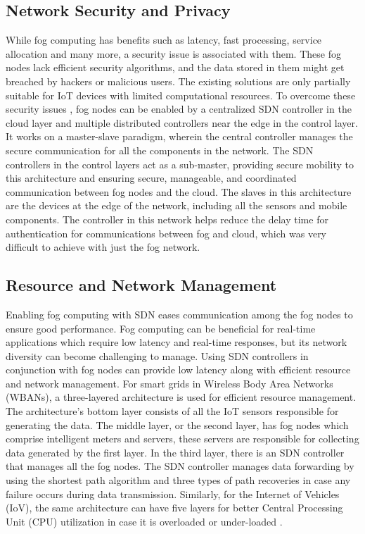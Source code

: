 \documentclass[conference]{IEEEtran}
\begin{document}
\subsection{Network Security and Privacy}
While fog computing has benefits such as latency, fast processing, service allocation and many more, a security issue is associated with them. These fog nodes lack efficient security algorithms, and the data stored in them might get breached by hackers or malicious users. The existing solutions are only partially suitable for IoT devices with limited computational resources. To overcome these security issues \cite{kahva}, fog nodes can be enabled by a centralized SDN controller in the cloud layer and multiple distributed controllers near the edge in the control layer. It works on a master-slave paradigm, wherein the central controller manages the secure communication for all the components in the network. The SDN controllers in the control layers act as a sub-master, providing secure mobility to this architecture and ensuring secure, manageable, and coordinated communication between fog nodes and the cloud. The slaves in this architecture are the devices at the edge of the network, including all the sensors and mobile components. The controller in this network helps reduce the delay time for authentication for communications between fog and cloud, which was very difficult to achieve with just the fog network.

\subsection{Resource and Network Management}
Enabling fog computing with SDN eases communication among the fog nodes to ensure good performance. Fog computing can be beneficial for real-time applications which require low latency and real-time responses, but its network diversity can become challenging to manage. Using SDN controllers in conjunction with fog nodes can provide low latency along with efficient resource and network management. For smart grids in Wireless Body Area Networks (WBANs)\cite{ren}, a three-layered architecture is used for efficient resource management. The architecture's bottom layer consists of all the IoT sensors responsible for generating the data. The middle layer, or the second layer, has fog nodes which comprise intelligent meters and servers, these servers are responsible for collecting data generated by the first layer. In the third layer, there is an SDN controller that manages all the fog nodes. The SDN controller manages data forwarding by using the shortest path algorithm and three types of path recoveries in case any failure occurs during data transmission. Similarly, for the Internet of Vehicles (IoV), the same architecture can have five layers for better Central Processing Unit (CPU) utilization in case it is overloaded or under-loaded \cite{alomari}.
\end{document}
